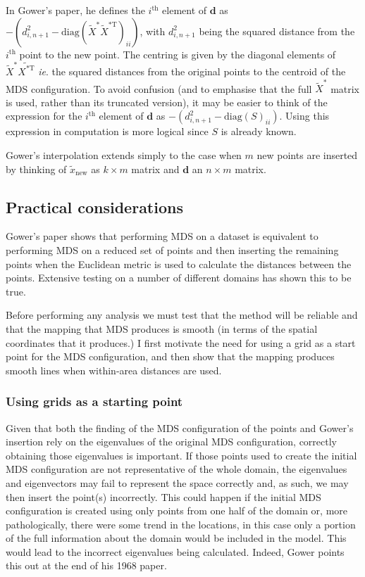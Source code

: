 \documentclass[a4paper,10pt]{article}
\newcommand{\cross}{\times}
\begin{document}
In Gower's paper, he defines the $i^\text{th}$ element of $\mathbf{d}$ as $-(d^2_{i,n+1}-\text{diag}(\tilde{X}^* \tilde{X}^{*\text{T}})_{ii})$, with $d^2_{i,n+1}$ being the squared distance from the $i^\text{th}$ point to the new point. The centring is given by the diagonal elements of $\tilde{X}^*\tilde{X^{* \text{T}}}$ \emph{ie}. the squared distances from the original points to the centroid of the MDS configuration. To avoid confusion (and to emphasise that the full $\tilde{X}^*$ matrix is used, rather than its truncated version), it may be easier to think of the expression for the $i^\text{th}$ element of $\mathbf{d}$ as $-(d^2_{i,n+1}-\text{diag}(S)_{ii})$. Using this expression in computation is more logical since $S$ is already known.

Gower's interpolation extends simply to the case when $m$ new points are inserted by thinking of $\tilde{x}_{\text{new}}$ as $k \cross m$ matrix and $\mathbf{d}$ an $n \cross m$ matrix.


\subsection{Practical considerations}

Gower's paper shows that performing MDS on a dataset is equivalent to performing MDS on a reduced set of points and then inserting the remaining points when the Euclidean metric is used to calculate the distances between the points. Extensive testing on a number of different domains has shown this to be true.

Before performing any analysis we must test that the method will be reliable and that the mapping that MDS produces is smooth (in terms of the spatial coordinates that it produces.) I first motivate the need for using a grid as a start point for the MDS configuration, and then show that the mapping produces smooth lines when within-area distances are used.

\subsubsection{Using grids as a starting point}
\label{grids}
Given that both the finding of the MDS configuration of the points and Gower's insertion rely on the eigenvalues of the original MDS configuration, correctly obtaining those eigenvalues is important. If those points used to create the initial MDS configuration are not representative of the whole domain, the eigenvalues and eigenvectors may fail to represent the space correctly and, as such, we may then insert the point(s) incorrectly. This could happen if the initial MDS configuration is created using only points from one half of the domain or, more pathologically, there were some trend in the locations, in this case only a portion of the full information about the domain would be included in the model. This would lead to the incorrect eigenvalues being calculated. Indeed, Gower points this out at the end of his 1968 paper.
\end{document}
